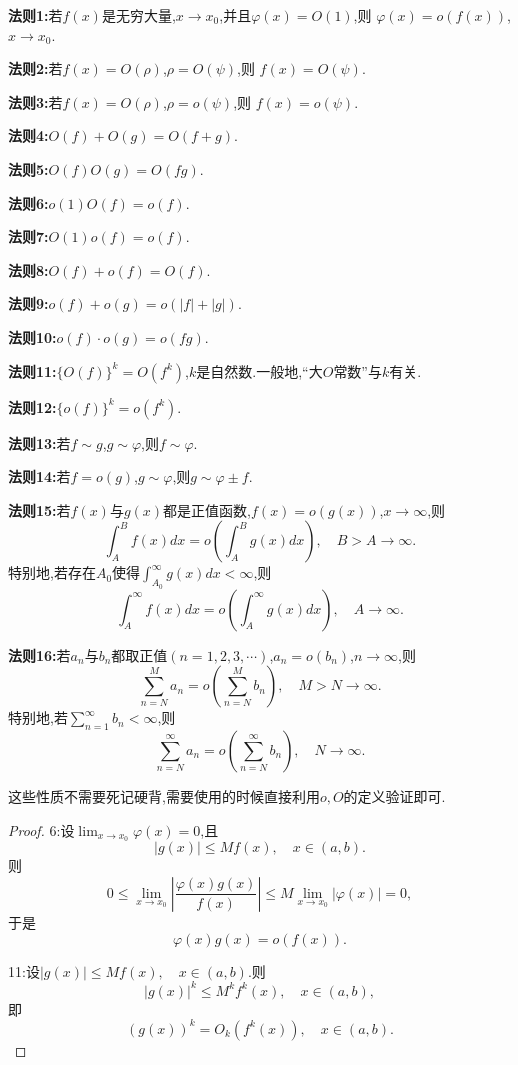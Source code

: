 \documentclass[lang=cn,newtx,10pt,scheme=chinese]{../Template/elegantbook}
\begin{document}
\begin{theorem}[$O$与$o$的基本运算法则]\label{$O$与$o$的基本运算法则}
    \textbf{法则1:}若\(f(x)\)是无穷大量,\(x\to x_0\),并且\(\varphi(x)=O(1)\),则
\(\varphi(x)=o(f(x))\),\(x\to x_0\).

\textbf{法则2:}若\(f(x)=O(\rho)\),\(\rho = O(\psi)\),则
\(f(x)=O(\psi)\).

\textbf{法则3:}若\(f(x)=O(\rho)\),\(\rho = o(\psi)\),则
\(f(x)=o(\psi)\).

\textbf{法则4:}\(O(f)+O(g)=O(f + g)\).

\textbf{法则5:}\(O(f)O(g)=O(fg)\).

\textbf{法则6:}\(o(1)O(f)=o(f)\).

\textbf{法则7:}\(O(1)o(f)=o(f)\).

\textbf{法则8:}\(O(f)+o(f)=O(f)\).

\textbf{法则9:}\(o(f)+o(g)=o(|f|+|g|)\).

\textbf{法则10:}\(o(f)\cdot o(g)=o(fg)\).

\textbf{法则11:}\(\{O(f)\}^k = O(f^k)\),\(k\)是自然数.一般地,“大\(O\)常数”与\(k\)有关.

\textbf{法则12:}\(\{o(f)\}^k = o(f^k)\).

\textbf{法则13:}若\(f\sim g\),\(g\sim\varphi\),则\(f\sim\varphi\).

\textbf{法则14:}若\(f = o(g)\),\(g\sim\varphi\),则\(g\sim\varphi\pm f\).

\textbf{法则15:}若\(f(x)\)与\(g(x)\)都是正值函数,\(f(x)=o(g(x))\),\(x\to\infty\),则
\[
\int_{A}^{B}f(x)dx = o\left(\int_{A}^{B}g(x)dx\right),\quad B > A\to\infty.
\]
特别地,若存在\(A_0\)使得\(\int_{A_0}^{\infty}g(x)dx<\infty\),则
\[
\int_{A}^{\infty}f(x)dx = o\left(\int_{A}^{\infty}g(x)dx\right),\quad A\to\infty.
\]

\textbf{法则16:}若\(a_n\)与\(b_n\)都取正值\((n = 1,2,3,\cdots)\),\(a_n=o(b_n)\),\(n\to\infty\),则
\[
\sum_{n = N}^{M}a_n = o\left(\sum_{n = N}^{M}b_n\right),\quad M > N\to\infty.
\]
特别地,若\(\sum_{n = 1}^{\infty}b_n<\infty\),则
\[
\sum_{n = N}^{\infty}a_n = o\left(\sum_{n = N}^{\infty}b_n\right),\quad N\to\infty.
\]
\end{theorem}
\begin{note}
这些性质不需要死记硬背,需要使用的时候直接利用$o,O$的定义验证即可.
\end{note}
\begin{proof}
    {\color[RGB]{128, 128, 0} 6:}设\(\lim_{x\to x_0}\varphi(x) = 0\),且
\[
|g(x)|\leq Mf(x),\quad x\in(a,b).
\]
则
\[
0\leq\lim_{x\to x_0}\left|\frac{\varphi(x)g(x)}{f(x)}\right|\leq M\lim_{x\to x_0}|\varphi(x)| = 0,
\]
于是
\[
\varphi(x)g(x)=o(f(x)).
\]

{\color[RGB]{128, 128, 0} 11:}设\(|g(x)|\leq Mf(x),\quad x\in(a,b)\).则
\[
|g(x)|^k\leq M^k f^k(x),\quad x\in(a,b),
\]
即
\[
(g(x))^k = O_k(f^k(x)),\quad x\in(a,b).
\]
\end{proof}
\end{document}
